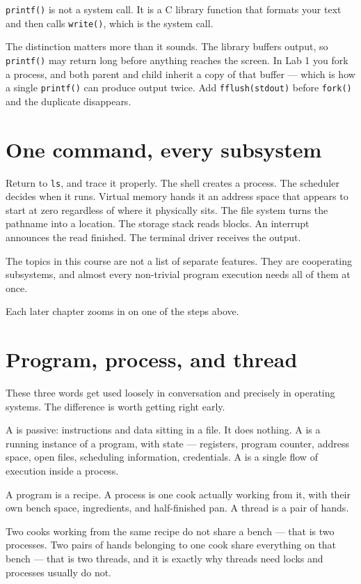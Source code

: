 \begin{pitfall}
\texttt{printf()} is not a system call. It is a C library function that formats your text and then calls \texttt{write()}, which is the system call.

The distinction matters more than it sounds. The library buffers output, so \texttt{printf()} may return long before anything reaches the screen. In Lab 1 you fork a process, and both parent and child inherit a copy of that buffer --- which is how a single \texttt{printf()} can produce output twice. Add \texttt{fflush(stdout)} before \texttt{fork()} and the duplicate disappears.
\end{pitfall}

\section*{One command, every subsystem}
Return to \texttt{ls}, and trace it properly. The shell creates a process. The scheduler decides when it runs. Virtual memory hands it an address space that appears to start at zero regardless of where it physically sits. The file system turns the pathname into a location. The storage stack reads blocks. An interrupt announces the read finished. The terminal driver receives the output.

\begin{keyidea}
The topics in this course are not a list of separate features. They are cooperating subsystems, and almost every non-trivial program execution needs all of them at once.

Each later chapter zooms in on one of the steps above.
\end{keyidea}

\section*{Program, process, and thread}
These three words get used loosely in conversation and precisely in operating systems. The difference is worth getting right early.

A  is passive: instructions and data sitting in a file. It does nothing. A  is a running instance of a program, with state --- registers, program counter, address space, open files, scheduling information, credentials. A  is a single flow of execution inside a process.

\begin{analogy}
A program is a recipe. A process is one cook actually working from it, with their own bench space, ingredients, and half-finished pan. A thread is a pair of hands.

Two cooks working from the same recipe do not share a bench --- that is two processes. Two pairs of hands belonging to one cook share everything on that bench --- that is two threads, and it is exactly why threads need locks and processes usually do not.
\end{analogy}

